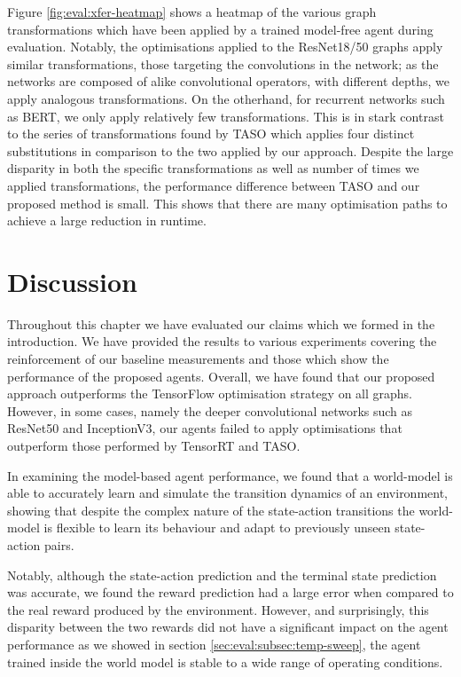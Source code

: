 Figure \ref{fig:eval:xfer-heatmap} shows a heatmap of the various graph transformations which have been applied by a trained model-free agent during evaluation. Notably, the optimisations applied to the ResNet18/50 graphs apply similar transformations, those targeting the convolutions in the network; as the networks are composed of alike convolutional operators, with different depths, we apply analogous transformations. On the otherhand, for recurrent networks such as BERT, we only apply relatively few transformations. This is in stark contrast to the series of transformations found by TASO which applies four distinct substitutions in comparison to the two applied by our approach. Despite the large disparity in both the specific transformations as well as number of times we applied transformations, the performance difference between TASO and our proposed method is small. This shows that there are many optimisation paths to achieve a large reduction in runtime.

\section{Discussion}
Throughout this chapter we have evaluated our claims which we formed in the introduction. We have provided the results to various experiments covering the reinforcement of our baseline measurements and those which show the performance of the proposed agents. Overall, we have found that our proposed approach outperforms the TensorFlow optimisation strategy on all graphs. However, in some cases, namely the deeper convolutional networks such as ResNet50 and InceptionV3, our agents failed to apply optimisations that outperform those performed by TensorRT and TASO.

In examining the model-based agent performance, we found that a world-model is able to accurately learn and simulate the transition dynamics of an environment, showing that despite the complex nature of the state-action transitions the world-model is flexible to learn its behaviour and adapt to previously unseen state-action pairs. 

Notably, although the state-action prediction and the terminal state prediction was accurate, we found the reward prediction had a large error when compared to the real reward produced by the environment. However, and surprisingly, this disparity between the two rewards did not have a significant impact on the agent performance as we showed in section \ref{sec:eval:subsec:temp-sweep}, the agent trained inside the world model is stable to a wide range of operating conditions.

